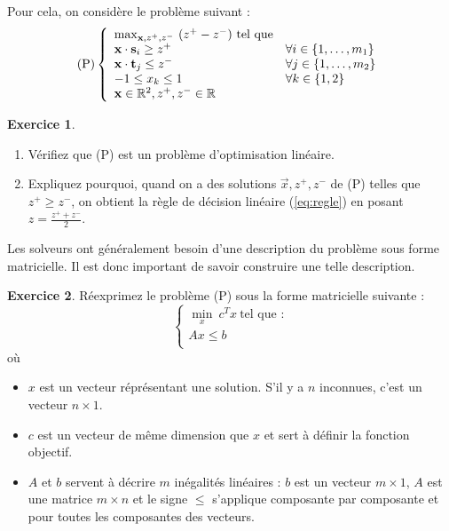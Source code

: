 \documentclass[a4paper,francais]{article}
\newcommand{\R}{{\ensuremath\mathbb{R}}}
\theoremstyle{definition}
\newtheorem{exercice}{Exercice}[section]
\begin{document}
Pour cela, on considère le problème suivant :
\[
\text{(P)}
\left\{
\begin{array}{ll}
  \max_{\vec{x},z^+,z^-} \ (z^+ - z^-) \ \text{tel que} & \\
  \vec{x} \cdot \vec{s}_i \geq z^+ & \forall i \in \{1,\dots,m_1\} \\ 
  \vec{x} \cdot \vec{t}_j \leq z^- & \forall j \in \{1,\dots,m_2\} \\
  -1 \leq x_k \leq 1 & \forall k \in \{1, 2\} \\
  \vec{x} \in \R^2, z^+, z^- \in \R \\
\end{array}
\right.
\]

\begin{exercice}

  \begin{enumerate}
  \item Vérifiez que (P) est un problème d'optimisation linéaire.
  \item Expliquez pourquoi, quand on a des solutions $\vec{x}, z^+, z^-$
    de (P) telles que $z^+ \geq z^-$, on obtient la règle de décision
    linéaire (\ref{eq:regle}) en posant $z = \frac{z^+ + z^-}{2}$.  
  \end{enumerate}

\end{exercice}

Les solveurs ont généralement besoin d'une description du problème
sous forme matricielle. Il est donc important de savoir construire
une telle description.

\begin{exercice}
  Réexprimez le problème (P)
  sous la forme matricielle suivante :
  \[
  \left\{
  \begin{array}{c}
    \min_x \ c^T x \ \text{tel que :} \\
    Ax \leq b \\
  \end{array}
  \right. 
  \]
  où 
\begin{itemize}
\item $x$ est un vecteur réprésentant une solution. S'il y a $n$ inconnues, c'est un vecteur $n \times 1$.
\item $c$ est un vecteur de même dimension que $x$ et sert à définir la fonction objectif.
\item $A$ et $b$ servent à décrire $m$ inégalités linéaires : $b$ est un vecteur $m \times 1$,
  $A$ est une matrice $m \times n$ et le signe $\leq$ s'applique composante par composante et pour
  toutes les composantes des vecteurs.
\end{itemize}
\end{exercice}
\end{document}
